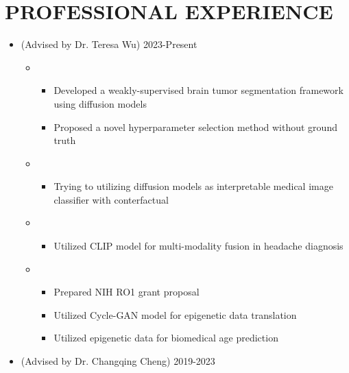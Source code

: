 \documentclass[10pt]{article}
\begin{document}
\section*{PROFESSIONAL EXPERIENCE}
\begin{itemize}
	\item {} (Advised by Dr. Teresa Wu)
        \hfill{2023-Present}
        \begin{itemize}[label=$\bullet$]
            \item {}
            \begin{itemize}[label=$-$]
	            \item Developed a weakly-supervised brain tumor segmentation framework using diffusion models
	            \item Proposed a novel hyperparameter selection method without ground truth
	        \end{itemize}
            \item {}
            \begin{itemize}[label=$-$]
				\item Trying to utilizing diffusion models as interpretable medical image classifier with conterfactual 
			\end{itemize}
            \item {}
            \begin{itemize}[label=$-$]
				\item Utilized CLIP model for multi-modality fusion in headache diagnosis
			\end{itemize}

			\item {}
			\begin{itemize}[label=$-$]
				\item Prepared NIH RO1 grant proposal
				\item Utilized Cycle-GAN model for epigenetic data translation
				\item Utilized epigenetic data for biomedical age prediction 
			\end{itemize}
        \end{itemize}
        
        
	\item {} (Advised by Dr. Changqing Cheng)
	\hfill{2019-2023}
	\begin{itemize}[label=$\bullet$]
	

\end{itemize}
\end{itemize}
\end{document}
